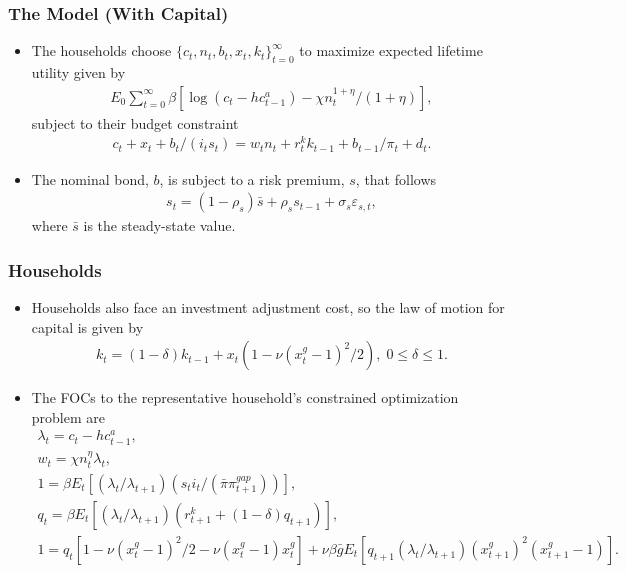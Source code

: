 \documentclass[11pt]{beamer}
\begin{document}
\begin{frame}\frametitle{The Model (With Capital)}
\begin{itemize}\setlength{\itemsep}{6pt}
\item <1-|handout:1>The households choose $\{c_t, n_t, b_t, x_t, k_t\}_{t=0}^\infty$ to maximize expected lifetime utility given by
\begin{gather*}
E_0\sum_{t=0}^\infty\beta[\log(c_t-hc^a_{t-1}) - \chi n_t^{1+\eta}/(1+\eta)],
\end{gather*} 
subject to their budget constraint
\begin{gather*}
    c_t+x_t+b_t/(i_ts_t)=w_tn_t+r_t^kk_{t-1}+b_{t-1}/\pi_t+d_t.
  \end{gather*} 
\item <2-|handout:1>The nominal bond, $b$, is subject to a risk premium, $s$, that follows
\begin{gather*}
  s_t = (1-\rho_s)\bar{s} + \rho_ss_{t-1} + \sigma_s\varepsilon_{s,t},
\end{gather*}
where $\bar{s}$ is the steady-state value. %
\end{itemize}
\end{frame}
\begin{frame}\frametitle{Households}
\begin{itemize}\setlength{\itemsep}{8pt}
\item <1-|handout:1>Households also face an investment adjustment cost, so the law of motion for capital is given by
\begin{gather*}
  k_t = (1-\delta)k_{t-1} + x_t(1-\nu(x^g_t - 1)^2/2),\; 0 \leq \delta \leq 1.
  \end{gather*} %
\item <2-|handout:1>The FOCs to the representative household's constrained optimization problem are
\scriptsize
\begin{gather*}
  \lambda_t = c_t - hc^a_{t-1}, \\
  w_t = \chi n_t^\eta \lambda_t,\\
  1 =  \beta E_t[(\lambda_t/\lambda_{t+1})(s_ti_t/(\bar{\pi}\pi_{t+1}^{gap}))],\\
  q_t = \beta E_t[(\lambda_t/\lambda_{t+1})(r^k_{t+1}+(1-\delta)q_{t+1})],\\
  1 = q_t[1-\nu(x^g_t-1)^2/2 - \nu(x_t^g-1)x_t^g] + \nu\beta\bar{g}E_t[q_{t+1}(\lambda_t/\lambda_{t+1})(x^g_{t+1})^2(x^g_{t+1}-1)].\\
\end{gather*} %
\normalsize
\end{itemize}
\end{frame}
\end{document}
